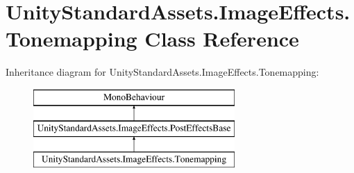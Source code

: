 \hypertarget{class_unity_standard_assets_1_1_image_effects_1_1_tonemapping}{}\section{Unity\+Standard\+Assets.\+Image\+Effects.\+Tonemapping Class Reference}
\label{class_unity_standard_assets_1_1_image_effects_1_1_tonemapping}
Inheritance diagram for Unity\+Standard\+Assets.\+Image\+Effects.\+Tonemapping\+:\begin{figure}[H]
\begin{center}
\leavevmode
\includegraphics[height=3.000000cm]{class_unity_standard_assets_1_1_image_effects_1_1_tonemapping}
\end{center}
\end{figure}
